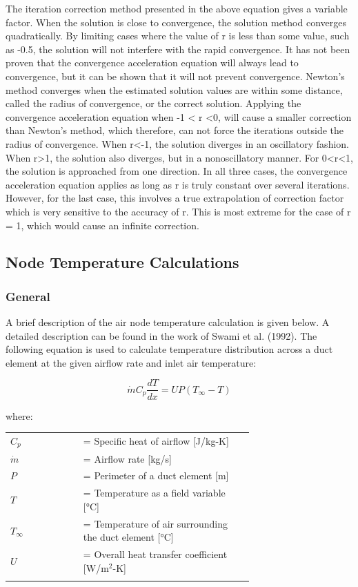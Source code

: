 The iteration correction method presented in the above equation gives a variable factor. When the solution is close to convergence, the solution method converges quadratically. By limiting cases where the value of r is less than some value, such as -0.5, the solution will not interfere with the rapid convergence. It has not been proven that the convergence acceleration equation will always lead to convergence, but it can be shown that it will not prevent convergence. Newton's method converges when the estimated solution values are within some distance, called the radius of convergence, or the correct solution. Applying the convergence acceleration equation when -1 \textless{} r \textless{}0, will cause a smaller correction than Newton's method, which therefore, can not force the iterations outside the radius of convergence. When r\textless{}-1, the solution diverges in an oscillatory fashion. When r\textgreater{}1, the solution also diverges, but in a nonoscillatory manner. For 0\textless{}r\textless{}1, the solution is approached from one direction. In all three cases, the convergence acceleration equation applies as long as r is truly constant over several iterations. However, for the last case, this involves a true extrapolation of correction factor which is very sensitive to the accuracy of r. This is most extreme for the case of r = 1, which would cause an infinite correction.

\subsection{Node Temperature Calculations}\label{node-temperature-calculations}

\subsubsection{General}

A brief description of the air node temperature calculation is given below. A detailed description can be found in the work of Swami et al. (1992). The following equation is used to calculate temperature distribution across a duct element at the given airflow rate and inlet air temperature:

\begin{equation}
\dot{m} C_p \frac{dT}{dx} = UP(T_\infty  - T)
\end{equation}

where:

\begin{tabular}{lp{0.7\linewidth}}
\\
$C_p$ &= Specific heat of airflow [J/kg-K]\\
$\dot{m}$ &= Airflow rate [kg/s]\\
$P$ &= Perimeter of a duct element [m]\\
$T$ &= Temperature as a field variable [°C]\\
$T_\infty$ &= Temperature of air surrounding the duct element [°C]\\
$U$ &= Overall heat transfer coefficient [W/m\(^{2}\)-K]\\
\\
\end{tabular}

